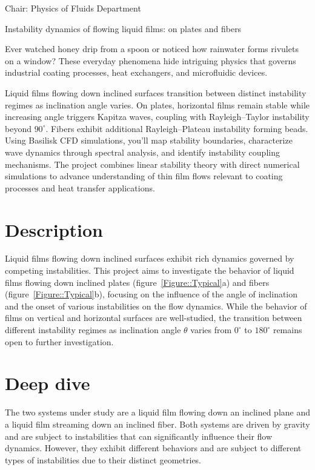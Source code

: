 \documentclass[a4paper,10pt]{article}
\begin{document}
\noindent Chair: Physics of Fluids Department
\begin{center}
 \begin{LARGE}
  Instability dynamics of flowing liquid films: on plates and fibers
 \end{LARGE}
\end{center}

\noindent Ever watched honey drip from a spoon or noticed how rainwater forms rivulets on a window? These everyday phenomena hide intriguing physics that governs industrial coating processes, heat exchangers, and microfluidic devices.


\begin{tcolorbox}[colback=mgray,colframe=mpurple,title=TL;DR]
    Liquid films flowing down inclined surfaces transition between distinct instability regimes as inclination angle varies. On plates, horizontal films remain stable while increasing angle triggers Kapitza waves, coupling with Rayleigh--Taylor instability beyond $90^\circ$. Fibers exhibit additional Rayleigh--Plateau instability forming beads. Using Basilisk CFD simulations, you'll map stability boundaries, characterize wave dynamics through spectral analysis, and identify instability coupling mechanisms. The project combines linear stability theory with direct numerical simulations to advance understanding of thin film flows relevant to coating processes and heat transfer applications.
\end{tcolorbox}

\section*{Description}

Liquid films flowing down inclined surfaces exhibit rich dynamics governed by competing instabilities. This project aims to investigate the behavior of liquid films flowing down inclined plates (figure~\ref{Figure::Typical}a) and fibers  (figure~\ref{Figure::Typical}b), focusing on the influence of the angle of inclination and the onset of various instabilities on the flow dynamics. While the behavior of films on vertical and horizontal surfaces are well-studied, the transition between different instability regimes as inclination angle $\theta$ varies from $0^\circ$ to $180^\circ$ remains open to further investigation.

\section*{Deep dive}
The two systems under study are a liquid film flowing down an inclined plane and a liquid film streaming down an inclined fiber. Both systems are driven by gravity and are subject to instabilities that can significantly influence their flow dynamics. However, they exhibit different behaviors and are subject to different types of instabilities due to their distinct geometries.
\end{document}
